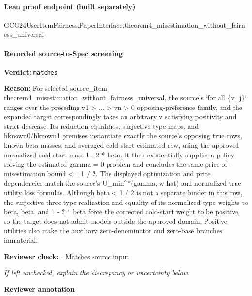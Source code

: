\documentclass[10pt]{article}
\newcommand{\reviewerbox}{%
  \par\noindent\fbox{\parbox{0.96\linewidth}{\rule{0pt}{0.38in}}}\par
}
\newcommand{\reviewmatch}[1]{%
  \par\noindent\textbf{Reviewer check:} $\square$\; #1\par
  \noindent\emph{If left unchecked, explain the discrepancy or uncertainty below.}\par
}
\begin{document}
\paragraph{Lean proof endpoint (built separately)}\begin{ReviewVerbatim}
GCG24UserItemFairness.PaperInterface.theorem4_misestimation_without_fairness_universal
\end{ReviewVerbatim}

\paragraph{Recorded source-to-Spec screening}
\textbf{Verdict:} \texttt{matches}
\\
{\raggedright
\textbf{Reason:} For selected source\_\allowbreak{}item theorem4\_\allowbreak{}misestimation\_\allowbreak{}without\_\allowbreak{}fairness\_\allowbreak{}universal, the source's `for all \{v\_\allowbreak{}j\}` ranges over the preceding v1 > .\allowbreak{}.\allowbreak{}.\allowbreak{} > vn > 0 opposing-\allowbreak{}preference family, and the expanded target correspondingly takes an arbitrary v satisfying positivity and strict decrease.\allowbreak{} Its reduction equalities, surjective type maps, and hknown0/\allowbreak{}hknown1 premises instantiate exactly the source's opposing true rows, known beta masses, and averaged cold-\allowbreak{}start estimated row, using the approved normalized cold-\allowbreak{}start mass 1 -\allowbreak{} 2 * beta.\allowbreak{} It then existentially supplies a policy solving the estimated gamma = 0 problem and concludes the same price-\allowbreak{}of-\allowbreak{}misestimation bound <= 1 /\allowbreak{} 2.\allowbreak{} The displayed optimization and price dependencies match the source's U\_\allowbreak{}min\textasciicircum{}*(gamma, w-\allowbreak{}hat) and normalized true-\allowbreak{}utility loss formulas.\allowbreak{} Although beta < 1 /\allowbreak{} 2 is not a separate binder in this row, the surjective three-\allowbreak{}type realization and equality of its normalized type weights to beta, beta, and 1 -\allowbreak{} 2 * beta force the corrected cold-\allowbreak{}start weight to be positive, so the target does not admit models outside the approved domain.\allowbreak{} Positive utilities also make the auxiliary zero-\allowbreak{}denominator and zero-\allowbreak{}base branches immaterial.\allowbreak{}
\par}
\reviewmatch{Matches source input}
\noindent\textbf{Reviewer annotation}\par
\reviewerbox
\clearpage
\hypertarget{source-claim-dd1e59dd74c380a1}{}
\hypertarget{source-section-ff6e74b6c8cd2005}{}
\end{document}
